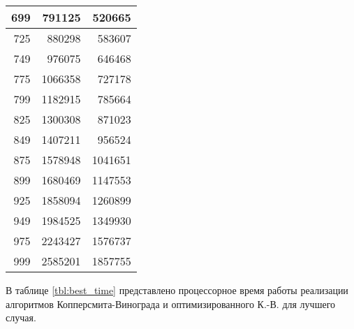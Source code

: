 \begin{table}[h]
\begin{center}
\begin{threeparttable}
\begin{tabular}{|r|r|r|}
		\hline
		699 & 791125 & 520665 \\
		\hline
		725 & 880298 & 583607 \\
		\hline
		749 & 976075 & 646468 \\
		\hline
		775 & 1066358 & 727178 \\
		\hline
		799 & 1182915 & 785664 \\
		\hline
		825 & 1300308 & 871023 \\
		\hline
		849 & 1407211 & 956524 \\
		\hline
		875 & 1578948 & 1041651 \\
		\hline
		899 & 1680469 & 1147553 \\
		\hline
		925 & 1858094 & 1260899 \\
		\hline
		949 & 1984525 & 1349930 \\
		\hline
		975 & 2243427 & 1576737 \\
		\hline
		999 & 2585201 & 1857755 \\
		\hline
		\end{tabular}
	\end{threeparttable}
\end{center}
\end{table}

\clearpage

В таблице \ref{tbl:best_time} представлено процессорное время работы реализации алгоритмов
Копперсмита-Винограда и оптимизированного К.-В. для лучшего случая.

